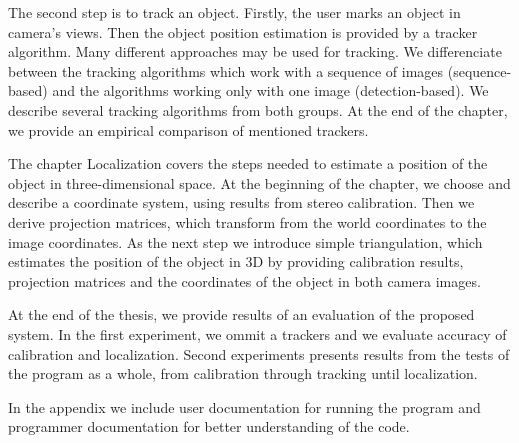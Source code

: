 The second step is to track an object. Firstly, the user marks an object in
camera's views. Then the object position estimation is provided by a tracker
algorithm. Many different approaches may be used for tracking. We differenciate
between the tracking algorithms which work with a sequence of images
(sequence-based) and the algorithms working only with one image
(detection-based). We describe several tracking algorithms from both groups. At
the end of the chapter, we provide an empirical comparison of mentioned trackers.

The chapter Localization covers the steps needed to estimate a position of the
object in three-dimensional space. At the beginning of the chapter, we choose
and describe a coordinate system, using results from stereo calibration. Then we
derive projection matrices, which transform from the world coordinates to the
image coordinates. As the next step we introduce simple triangulation, which
estimates the position of the object in 3D by providing calibration results,
projection matrices and the coordinates of the object in both camera images.

At the end of the thesis, we provide results of an evaluation of the proposed
system. In the first experiment, we ommit a trackers and we evaluate accuracy
of calibration and localization. Second experiments presents results from the
tests of the program as a whole, from calibration through tracking until
localization. 

In the appendix we include user documentation for running the program and
programmer documentation for better understanding of the code.
